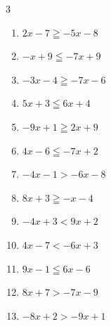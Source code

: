 \begin{multicols}{3}
\begin{enumerate}
        \phantom{$\displaystyle x\leqq -1$}

  \item $2x-7\geqq -5x-8$


  \item $-x+9\leqq -7x+9$

        \phantom{$\displaystyle x\leqq 0$}

  \item $-3x-4\geqq -7x-6$


  \item $5x+3\leqq 6x+4$

        \phantom{$\displaystyle x\geqq -1$}

\columnbreak %

  \item $-9x+1\geqq 2x+9$


  \item $4x-6\leqq -7x+2$


  \item $-4x-1>-6x-8$


  \item $8x+3\geqq -x-4$


  \item $-4x+3<9x+2$


  \item $4x-7<-6x+3$

        \phantom{$\displaystyle x<1$}

  \item $9x-1\leqq 6x-6$


  \item $8x+7>-7x-9$


  \item $-8x+2>-9x+1$


\end{enumerate}
\end{multicols}
